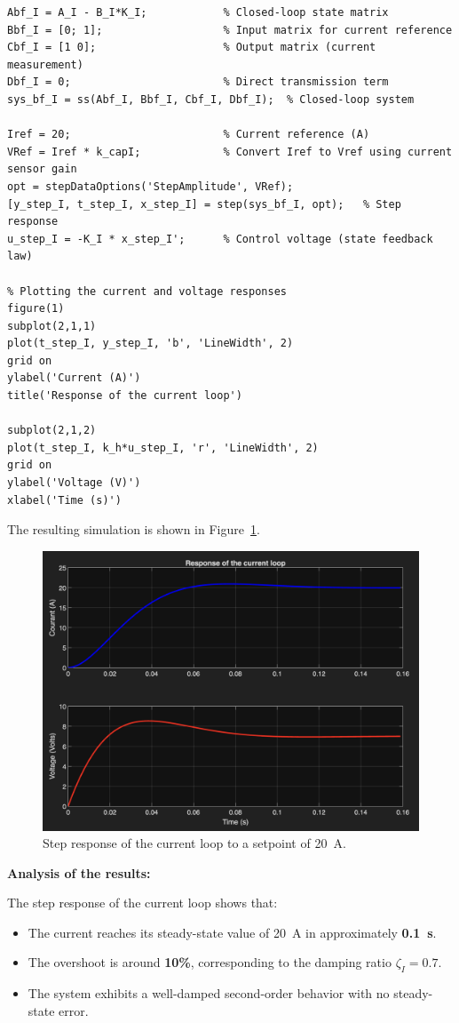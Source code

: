\documentclass{rapportCS}
\begin{document}
\begin{verbatim}
Abf_I = A_I - B_I*K_I;            % Closed-loop state matrix
Bbf_I = [0; 1];                   % Input matrix for current reference
Cbf_I = [1 0];                    % Output matrix (current measurement)
Dbf_I = 0;                        % Direct transmission term
sys_bf_I = ss(Abf_I, Bbf_I, Cbf_I, Dbf_I);  % Closed-loop system

Iref = 20;                        % Current reference (A)
VRef = Iref * k_capI;             % Convert Iref to Vref using current sensor gain
opt = stepDataOptions('StepAmplitude', VRef);
[y_step_I, t_step_I, x_step_I] = step(sys_bf_I, opt);   % Step response
u_step_I = -K_I * x_step_I';      % Control voltage (state feedback law)

% Plotting the current and voltage responses
figure(1)
subplot(2,1,1)
plot(t_step_I, y_step_I, 'b', 'LineWidth', 2)
grid on
ylabel('Current (A)')
title('Response of the current loop')

subplot(2,1,2)
plot(t_step_I, k_h*u_step_I, 'r', 'LineWidth', 2)
grid on
ylabel('Voltage (V)')
xlabel('Time (s)')
\end{verbatim}

The resulting simulation is shown in Figure~\ref{fig:current_response}.

\begin{figure}[H]
    \centering
    \includegraphics[width=0.85\linewidth]{figures/response_to_current_loop.png}
    \caption{Step response of the current loop to a setpoint of 20~A.}
    \label{fig:current_response}
\end{figure}

\noindent\textbf{Analysis of the results:}

The step response of the current loop shows that:
\begin{itemize}
    \item The current reaches its steady-state value of 20~A in approximately \textbf{0.1~s}.
    \item The overshoot is around \textbf{10\%}, corresponding to the damping ratio $\zeta_I = 0.7$.
    \item The system exhibits a well-damped second-order behavior with no steady-state error.
\end{itemize}
\end{document}
